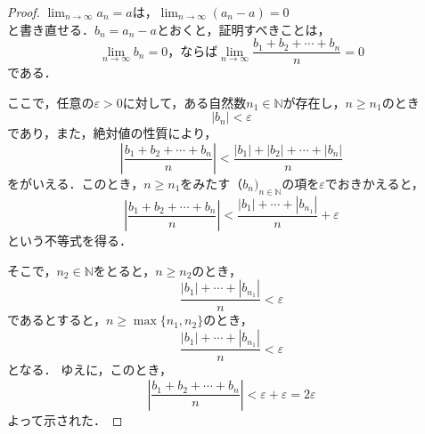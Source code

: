 \documentclass[dvipdfmx,uplatex,11pt]{jsarticle}
\begin{document}
\begin{leftbar}
	\begin{proof}
		$\lim_{n \to \infty} a_n= a$は，$ \lim_{n \to \infty} (a_n - a)= 0$\\
		と書き直せる．$b_n = a_n -a$とおくと，証明すべきことは，
		\[
			\lim_{n \to \infty} b_n=0，ならば \lim_{n \to \infty} \frac{b_1 + b_2 + \cdots +b_n}{n} = 0
		\]
		である．\par
		ここで，任意の$\varepsilon > 0$に対して，ある自然数$n_1 \in \mathbb{N}$が存在し，$n \ge n_1$のとき
		\[
			|b_n|<\varepsilon
		\]
		であり，また，絶対値の性質により，
		\[
			\left| \frac{b_1 + b_2 + \cdots +b_n}{n} \right| <\frac{|b_1| + |b_2| + \cdots +|b_n|}{n}
		\]
		をがいえる．このとき，$n \ge n_1$をみたす$（b_n)_{n \in \mathbb{N}}$の項を$\varepsilon$でおきかえると，
		\[
			\left| \frac{b_1 + b_2 + \cdots +b_n}{n} \right| < \frac{|b_1|+ \cdots + |b_{n_1}|}{n} +\varepsilon
		\]
		という不等式を得る．\par
		そこで，$n_2 \in \mathbb{N}$をとると，$n \ge n_2$のとき，
		\[
			\frac{|b_1|+ \cdots + |b_{n_1}|}{n} <\varepsilon
		\]
		であるとすると，$n \ge \max \{ n_1,n_2\}$のとき，
		\[
			\frac{|b_1|+ \cdots + |b_{n_1}|}{n} < \varepsilon
		\]
		となる．
		ゆえに，このとき，
		\[
			\left| \frac{ b_1 + b_2 + \cdots +b_n}{n} \right|　< \varepsilon+\varepsilon=2\varepsilon
		\]
		よって示された．
	\end{proof}
\end{leftbar}
%
\newpage
%
\setcounter{equation}{0}
\end{document}
